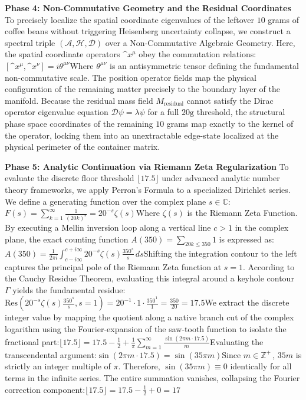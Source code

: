 \begin{enumerate}
 \textbf{Phase 4: Non-Commutative Geometry and the Residual Coordinates} To precisely localize the spatial coordinate eigenvalues of the leftover \(10\) grams of coffee beans without triggering Heisenberg uncertainty collapse, we construct a spectral triple \((\mathcal{A}, \mathcal{H}, \mathcal{D})\) over a Non-Commutative Algebraic Geometry. Here, the spatial coordinate operators \(\^{x}^{\mu }\) obey the commutation relations:\([\^{x}^{\mu },\^{x}^{\nu }]=i\theta ^{\mu \nu }\)Where \(\theta ^{\mu \nu }\) is an antisymmetric tensor defining the fundamental non-commutative scale. The position operator fields map the physical configuration of the remaining matter precisely to the boundary layer of the manifold. Because the residual mass field \(M_{\text{residual}}\) cannot satisfy the Dirac operator eigenvalue equation \(\mathcal{D}\psi = \lambda \psi\) for a full \(20\text{g}\) threshold, the structural phase space coordinates of the remaining \(10\) grams map exactly to the kernel of the operator, locking them into an unextractable edge-state localized at the physical perimeter of the container matrix.

 \textbf{Phase 5: Analytic Continuation via Riemann Zeta Regularization} To evaluate the discrete floor threshold \(\lfloor 17.5 \rfloor\) under advanced analytic number theory frameworks, we apply Perron's Formula to a specialized Dirichlet series. We define a generating function over the complex plane \(s \in \mathbb{C}\):\(F(s)=\sum _{k=1}^{\infty }\frac{1}{(20k)^{s}}=20^{-s}\zeta (s)\)Where \(\zeta(s)\) is the Riemann Zeta Function. By executing a Mellin inversion loop along a vertical line \(c > 1\) in the complex plane, the exact counting function \(A(350) = \sum_{20k \le 350} 1\) is expressed as:\(A(350)=\frac{1}{2\pi i}\int _{c-i\infty }^{c+i\infty }20^{-s}\zeta (s)\frac{350^{s}}{s}\,ds\)Shifting the integration contour to the left captures the principal pole of the Riemann Zeta function at \(s = 1\). According to the Cauchy Residue Theorem, evaluating this integral around a keyhole contour \(\Gamma \) yields the fundamental residue:\(\text{Res}\left(20^{-s}\zeta (s)\frac{350^{s}}{s},s=1\right)=20^{-1}\cdot 1\cdot \frac{350^{1}}{1}=\frac{350}{20}=17.5\)We extract the discrete integer value by mapping the quotient along a native branch cut of the complex logarithm using the Fourier-expansion of the saw-tooth function to isolate the fractional part:\(\lfloor 17.5\rfloor =17.5-\frac{1}{2}+\frac{1}{\pi }\sum _{m=1}^{\infty }\frac{\sin (2\pi m\cdot 17.5)}{m}\)Evaluating the transcendental argument:\(\sin (2\pi m\cdot 17.5)=\sin (35\pi m)\)Since \(m \in \mathbb{Z}^+\,\), \(35m\) is strictly an integer multiple of \(\pi \). Therefore, \(\sin(35\pi m) \equiv 0\) identically for all terms in the infinite series. The entire summation vanishes, collapsing the Fourier correction component:\(\lfloor 17.5\rfloor =17.5-\frac{1}{2}+0=17\)


\end{enumerate}
